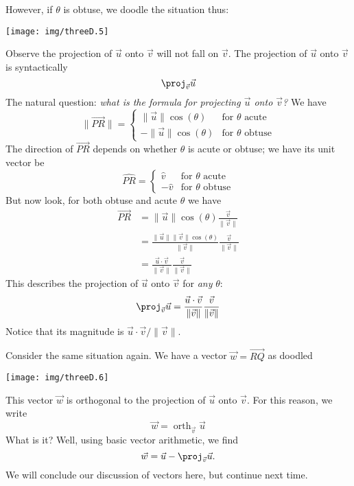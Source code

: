 However, if $\theta$ is obtuse, we doodle the situation thus:
\begin{center}
\texttt{[image: img/threeD.5]}
\end{center}
Observe the projection of $\vec{u}$ onto $\vec{v}$ will not fall
on $\vec{v}$. The projection of $\vec{u}$ onto $\vec{v}$ is
syntactically 
\begin{equation}
\proj_{\vec{v}}\vec{u}
\end{equation}
The natural question: \emph{what is the formula for projecting
$\vec{u}$ onto $\vec{v}$?} We have
\begin{equation}
\|\overrightarrow{PR}\|=\begin{cases}\|\vec{u}\|\cos(\theta)
&\mbox{for $\theta$ acute}\\
-\|\vec{u}\|\cos(\theta)&\mbox{for $\theta$ obtuse}
\end{cases}
\end{equation}
The direction of $\overrightarrow{PR}$ depends on whether
$\theta$ is acute or obtuse; we have its unit vector be
\begin{equation}
\widehat{PR}=\begin{cases}\widehat{v}&\mbox{for $\theta$ acute}\\
-\widehat{v}&\mbox{for $\theta$ obtuse}
\end{cases}
\end{equation}
But now look, for both obtuse and acute $\theta$ we have
\begin{equation}
\begin{aligned}
\overrightarrow{PR}
&=\|\vec{u}\|\cos(\theta)\frac{\vec{v}}{\|\vec{v}\|}\\
&=\frac{\|\vec{u}\|\|\vec{v}\|\cos(\theta)}{\|\vec{v}\|}\frac{\vec{v}}{\|\vec{v}\|}\\
&=\frac{\vec{u}\cdot\vec{v}}{\|\vec{v}\|}\frac{\vec{v}}{\|\vec{v}\|}
\end{aligned}
\end{equation}
This describes the projection of $\vec{u}$ onto $\vec{v}$
for \emph{any} $\theta$:
\begin{equation}
\proj_{\vec{v}}\vec{u}=\frac{\vec{u}\cdot\vec{v}}{\|\vec{v}\|}\frac{\vec{v}}{\|\vec{v}\|}
\end{equation}
Notice that its magnitude is $\vec{u}\cdot\vec{v}/\|\vec{v}\|$. 

\M
Consider the same situation again. We have a vector
$\vec{w}=\overrightarrow{RQ}$ as doodled
\begin{center}
\texttt{[image: img/threeD.6]}
\end{center}
This vector $\vec{w}$ is orthogonal to the projection of
$\vec{u}$ onto $\vec{v}$. For this reason, we write
\begin{equation}
\vec{w} = \mathop{\mathrm{orth}}\nolimits_{\vec{v}}\vec{u}
\end{equation}
What is it? Well, using basic vector arithmetic, we find
\begin{equation}
\vec{w} = \vec{u} - \proj_{\vec{v}}\vec{u}.
\end{equation}
We will conclude our discussion of vectors here, but continue
next time.
